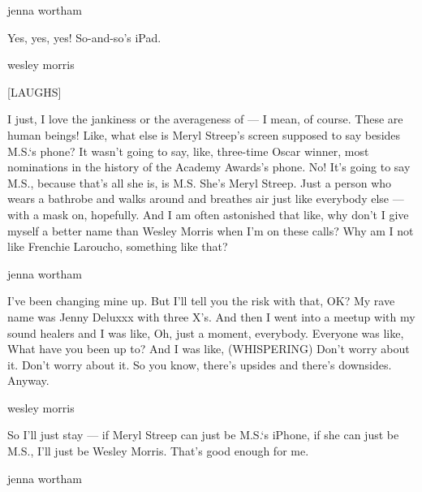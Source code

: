 jenna wortham

Yes, yes, yes! So-and-so's iPad.

wesley morris

{[}LAUGHS{]}

I just, I love the jankiness or the averageness of --- I mean, of
course. These are human beings! Like, what else is Meryl Streep's screen
supposed to say besides M.S.`s phone? It wasn't going to say, like,
three-time Oscar winner, most nominations in the history of the Academy
Awards's phone. No! It's going to say M.S., because that's all she is,
is M.S. She's Meryl Streep. Just a person who wears a bathrobe and walks
around and breathes air just like everybody else --- with a mask on,
hopefully. And I am often astonished that like, why don't I give myself
a better name than Wesley Morris when I'm on these calls? Why am I not
like Frenchie Laroucho, something like that?

jenna wortham

I've been changing mine up. But I'll tell you the risk with that, OK? My
rave name was Jenny Deluxxx with three X's. And then I went into a
meetup with my sound healers and I was like, Oh, just a moment,
everybody. Everyone was like, What have you been up to? And I was like,
(WHISPERING) Don't worry about it. Don't worry about it. So you know,
there's upsides and there's downsides. Anyway.

wesley morris

So I'll just stay --- if Meryl Streep can just be M.S.`s iPhone, if she
can just be M.S., I'll just be Wesley Morris. That's good enough for me.

jenna wortham

